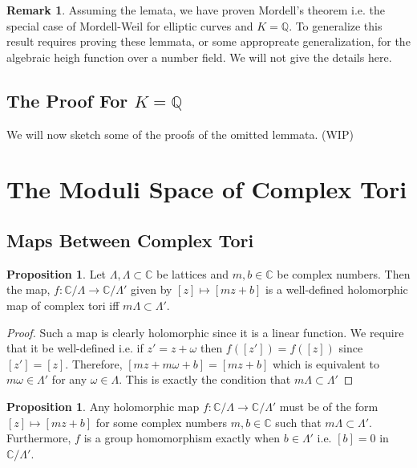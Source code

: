 \documentclass{article}
\newcommand{\Q}{\mathbb{Q}}
\newcommand{\C}{\mathbb{C}}
\theoremstyle{definition}
\newtheorem{proposition}[theorem]{Proposition}
\newtheorem{remark}{Remark}[section]
\begin{document}
\begin{remark}
Assuming the lemata, we have proven Mordell's theorem i.e. the special case of Mordell-Weil for elliptic curves and $K = \Q$. To generalize this result requires proving these lemmata, or some appropreate generalization, for the algebraic heigh function over a number field. We will not give the details here. 
\end{remark}

{\color{red}

\subsection{The Proof For $K = \Q$}

We will now sketch some of the proofs of the omitted lemmata. (WIP)
}

\section{The Moduli Space of Complex Tori}

\subsection{Maps Between Complex Tori}

\begin{proposition}
Let $\Lambda, \Lambda \subset \C$ be lattices and $m, b \in \C$ be complex numbers. Then the map, $f : \C / \Lambda \to \C / \Lambda'$ given by $[z] \mapsto [m z + b]$ is a well-defined holomorphic map of complex tori iff $m \Lambda \subset \Lambda'$. 
\end{proposition}

\begin{proof}
Such a map is clearly holomorphic since it is a linear function. We require that it be well-defined i.e. if $z' = z + \omega$ then $f([z']) = f([z])$ since $[z'] = [z]$. Therefore, $[m z + m \omega + b] = [m z + b]$ which is equivalent to $m \omega \in \Lambda'$ for any $\omega \in \Lambda$. This is exactly the condition that $m \Lambda \subset \Lambda'$
\end{proof}

\begin{proposition}
Any holomorphic map $f : \C / \Lambda \to \C / \Lambda'$ must be of the form $[z] \mapsto [m z + b]$ for some complex numbers $m,b \in \C$ such that $m \Lambda \subset \Lambda'$. Furthermore, $f$ is a group homomorphism exactly when $b \in \Lambda'$ i.e. $[b] = 0$ in $\C / \Lambda'$.
\end{proposition}
\end{document}
